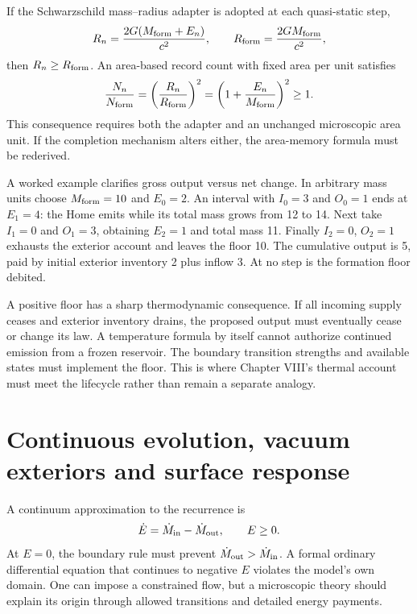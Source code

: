 If the Schwarzschild mass--radius adapter is adopted at each quasi-static step,
\begin{equation}
 R_n=\frac{2G(M_{\rm form}+E_n)}{c^2},\qquad
 R_{\rm form}=\frac{2GM_{\rm form}}{c^2},
 \label{c12:radius}
\end{equation}
then $R_n\geq R_{\rm form}$. An area-based record count with fixed area per unit satisfies
\begin{equation}
 \frac{N_n}{N_{\rm form}}=
 \left(\frac{R_n}{R_{\rm form}}\right)^2
 =\left(1+\frac{E_n}{M_{\rm form}}\right)^2\geq1.
 \label{c12:areamemory}
\end{equation}
This consequence requires both the adapter and an unchanged microscopic area unit. If the completion mechanism alters either, the area-memory formula must be rederived.

A worked example clarifies gross output versus net change. In arbitrary mass units choose $M_{\rm form}=10$ and $E_0=2$. An interval with $I_0=3$ and $O_0=1$ ends at $E_1=4$: the Home emits while its total mass grows from 12 to 14. Next take $I_1=0$ and $O_1=3$, obtaining $E_2=1$ and total mass 11. Finally $I_2=0$, $O_2=1$ exhausts the exterior account and leaves the floor 10. The cumulative output is 5, paid by initial exterior inventory 2 plus inflow 3. At no step is the formation floor debited.

A positive floor has a sharp thermodynamic consequence. If all incoming supply ceases and exterior inventory drains, the proposed output must eventually cease or change its law. A temperature formula by itself cannot authorize continued emission from a frozen reservoir. The boundary transition strengths and available states must implement the floor. This is where Chapter VIII's thermal account must meet the lifecycle rather than remain a separate analogy.

\section{Continuous evolution, vacuum exteriors and surface response}
A continuum approximation to the recurrence is
\begin{equation}
 \dot E=\dot M_{\rm in}-\dot M_{\rm out},\qquad E\geq0.
 \label{c12:continuous}
\end{equation}
At $E=0$, the boundary rule must prevent $\dot M_{\rm out}>\dot M_{\rm in}$. A formal ordinary differential equation that continues to negative $E$ violates the model's own domain. One can impose a constrained flow, but a microscopic theory should explain its origin through allowed transitions and detailed energy payments.


